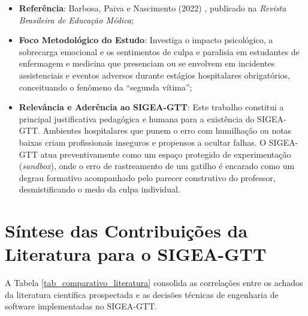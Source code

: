 \begin{itemize}
    \item \textbf{Referência}: Barbosa, Paiva e Nascimento (2022) \cite{artigo_segundavitima2022}, publicado na \textit{Revista Brasileira de Educação Médica};
    \item \textbf{Foco Metodológico do Estudo}: Investiga o impacto psicológico, a sobrecarga emocional e os sentimentos de culpa e paralisia em estudantes de enfermagem e medicina que presenciam ou se envolvem em incidentes assistenciais e eventos adversos durante estágios hospitalares obrigatórios, conceituando o fenômeno da ``segunda vítima'';
    \item \textbf{Relevância e Aderência ao SIGEA-GTT}: Este trabalho constitui a principal justificativa pedagógica e humana para a existência do SIGEA-GTT. Ambientes hospitalares que punem o erro com humilhação ou notas baixas criam profissionais inseguros e propensos a ocultar falhas. O SIGEA-GTT atua preventivamente como um espaço protegido de experimentação (\textit{sandbox}), onde o erro de rastreamento de um gatilho é encarado como um degrau formativo acompanhado pelo parecer construtivo do professor, desmistificando o medo da culpa individual.
\end{itemize}

\section{Síntese das Contribuições da Literatura para o SIGEA-GTT}
\label{sec_sintese_literatura}

A Tabela \ref{tab_comparativo_literatura} consolida as correlações entre os achados da literatura científica prospectada e as decisões técnicas de engenharia de software implementadas no SIGEA-GTT.

